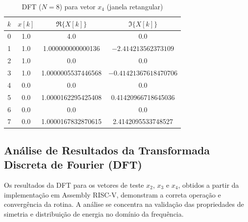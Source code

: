 \documentclass[12pt,a4paper]{article}
\begin{document}
\begin{table}[H]
\centering
\small
\caption{DFT ($N=8$) para vetor $x_4$ (janela retangular)}
\label{tab:dft_x4}
\begin{tabular}{@{}c c c c@{}}
\toprule
\textbf{$k$} & \textbf{$x[k]$} & \textbf{$\Re\{X[k]\}$} & \textbf{$\Im\{X[k]\}$} \\
\midrule
0 & 1.0 & 4.0 & 0.0 \\
1 & 1.0 & 1.000000000000136 & $-2.414213562373109$ \\
2 & 1.0 & 0.0 & 0.0 \\
3 & 1.0 & 1.0000005537446568 & $-0.41421367618470706$ \\
4 & 0.0 & 0.0 & 0.0 \\
5 & 0.0 & 1.0000162295425408 & 0.41420966718645036 \\
6 & 0.0 & 0.0 & 0.0 \\
7 & 0.0 & 1.0000167832870615 & 2.4142095533748527 \\
\bottomrule
\end{tabular}
\end{table}

\subsection*{Análise de Resultados da Transformada Discreta de Fourier (DFT)}

Os resultados da DFT para os vetores de teste $x_2$, $x_3$ e $x_4$, obtidos a partir da implementação em Assembly RISC-V, demonstram a correta operação e convergência da rotina. A análise se concentra na validação das propriedades de simetria e distribuição de energia no domínio da frequência.
\end{document}
